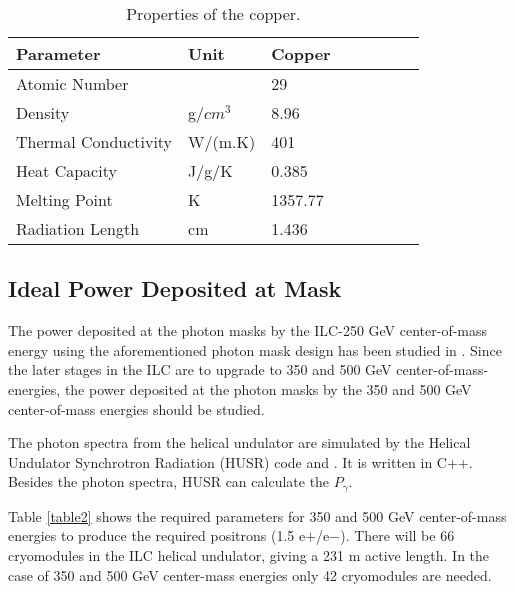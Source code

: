 \documentclass[a4paper]{article}
\begin{document}
\begin{table}[h]

\caption[ILC undulator parameters]{Properties of the copper.}
\centering %
\begin{tabular}{l*{6}{l}r} %
\hline\hline %



Parameter &              Unit  & Copper \\


\hline %

Atomic Number && 29  \\
Density & g/$cm^3$  & 8.96     \\
Thermal Conductivity   &  W/(m.K)& 401            \\
Heat Capacity &  J/g/K  &  0.385    \\
Melting Point &  K  & 1357.77 \\
Radiation Length & cm  & 1.436  \\



\hline %
\end{tabular}
\label{copper} %
\end{table}








\subsection{Ideal Power Deposited at Mask} 

The power deposited at the photon masks by the ILC-250 GeV center-of-mass energy using the aforementioned photon mask design has been studied in \cite {IPAC21}. Since the later stages in the ILC are to upgrade to 350 and 500 GeV center-of-mass-energies, the power deposited at the photon masks by the 350 and 500 GeV center-of-mass energies should be studied. 

The photon spectra from the helical undulator are simulated by the Helical Undulator Synchrotron Radiation (HUSR) code \cite{newton2010rapid} and \cite {newton2010modeling}. It is written in C++. Besides the photon spectra, HUSR can calculate the $P_\gamma$.

Table \ref{table2} shows the required parameters for 350 and 500 GeV center-of-mass energies to produce the required positrons (1.5 e$+$/e$-$). There will be 66 cryomodules in the ILC helical undulator, giving a 231 m active length. In the case of 350 and 500 GeV center-mass energies only 42 cryomodules are needed.
\end{document}

